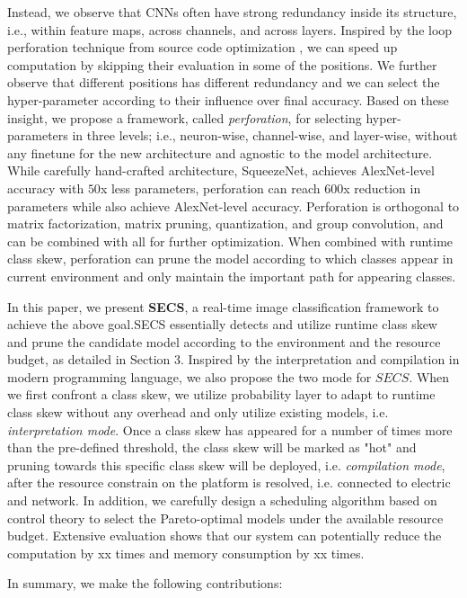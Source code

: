 \documentclass[pageno]{jpaper}
\begin{document}
Instead, we observe that CNNs often have strong redundancy inside its structure, i.e., within feature maps, across channels, and across layers. Inspired by the loop perforation technique from source code optimization \cite{figurnov2016perforatedcnns}, we can speed up computation by skipping their evaluation in some of the positions. We further observe that different positions has different redundancy and we can select the hyper-parameter according to their influence over final accuracy. Based on these insight, we propose a framework, called \textit{perforation}, for selecting hyper-parameters in three levels; i.e., neuron-wise, channel-wise, and layer-wise, without any finetune for the new architecture and agnostic to the model architecture. While carefully hand-crafted architecture, SqueezeNet, achieves AlexNet-level accuracy with $50$x less parameters, perforation can reach $600$x reduction in parameters while also achieve AlexNet-level accuracy. Perforation is orthogonal to matrix factorization, matrix pruning, quantization, and group convolution, and can be combined with all for further optimization. When combined with runtime class skew, perforation can prune the model according to which classes appear in current environment and only maintain the important path for appearing classes.

In this paper, we present \textbf{SECS}, a real-time image classification framework to achieve the above goal.SECS essentially detects and utilize runtime class skew and prune the candidate model according to the environment and the resource budget, as detailed in Section 3. Inspired by the interpretation and compilation in modern programming language, we also propose the two mode for $SECS$. When we first confront a class skew, we utilize probability layer to adapt to runtime class skew without any overhead and only utilize existing models, i.e. \textit{interpretation mode}. Once a class skew has appeared for a number of times more than the pre-defined threshold, the class skew will be marked as "hot" and pruning towards this specific class skew will be deployed, i.e. \textit{compilation mode}, after the resource constrain on the platform is resolved, i.e. connected to electric and network. In addition, we carefully design a scheduling algorithm based on control theory to select the Pareto-optimal models under the available resource budget. Extensive evaluation shows that our system can potentially reduce the computation by xx times and memory consumption by xx times.

In summary, we make the following contributions:
\end{document}
